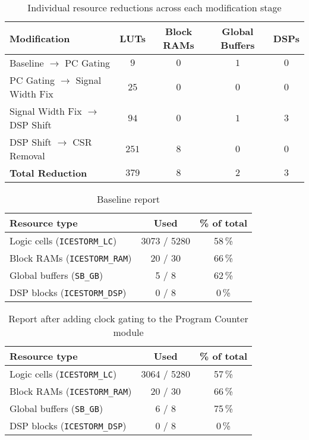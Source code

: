 \documentclass[a4paper,10pt]{article}
\begin{document}
\begin{table}[H] 
    \centering
    \begin{tabularx}{0.85\textwidth}{X c c c c}
        \toprule
        Modification & LUTs & Block RAMs & Global Buffers & DSPs \\ \midrule
        Baseline $\rightarrow$ PC Gating & $9$ & $0$ & $1$ & $0$ \\
        PC Gating $\rightarrow$ Signal Width Fix & $25$ & $0$ & $0$ & $0$ \\
        Signal Width Fix $\rightarrow$ DSP Shift & $94$ & $0$ & $1$ & $3$ \\
        DSP Shift $\rightarrow$ CSR Removal & $251$ & $8$ & $0$ & $0$ \\ \midrule
        \textbf{Total Reduction} & \textbf{$379$} & \textbf{$8$} & \textbf{$2$} & \textbf{$3$} \\
        \bottomrule
    \end{tabularx}
    \caption{Individual resource reductions across each modification stage}
    \label{tab:modification_reductions}
\end{table}

\begin{table}[H] 
    \centering
    \begin{tabularx}{0.65\textwidth}{X c c}
        \toprule
        Resource type & Used & \% of total \\ \midrule
        Logic cells (\texttt{ICESTORM\_LC}) & 3073 / 5280 & 58\,\% \\
        Block RAMs (\texttt{ICESTORM\_RAM}) & 20 / 30 & 66\,\% \\
        Global buffers (\texttt{SB\_GB}) & 5 / 8 & 62\,\% \\
        DSP blocks (\texttt{ICESTORM\_DSP}) & 0 / 8 & 0\,\% \\
        \bottomrule
    \end{tabularx}
    \caption{Baseline report}
    \label{tab:baseline}
\end{table}

\begin{table}[H] 
    \centering
    \begin{tabularx}{0.65\textwidth}{X c c}
        \toprule
        Resource type & Used & \% of total \\ \midrule
        Logic cells (\texttt{ICESTORM\_LC}) & 3064 / 5280 & 57\,\% \\
        Block RAMs (\texttt{ICESTORM\_RAM}) & 20 / 30 & 66\,\% \\
        Global buffers (\texttt{SB\_GB}) & 6 / 8 & 75\,\% \\
        DSP blocks (\texttt{ICESTORM\_DSP}) & 0 / 8 & 0\,\% \\
        \bottomrule
    \end{tabularx}
    \caption{Report after adding clock gating to the Program Counter module}
    \label{tab:Program_Counter}
\end{table}
\end{document}
